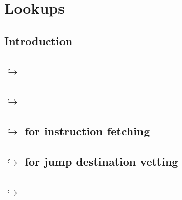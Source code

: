 

\section{Lookups } %
\subsection{Introduction                                                                                    \lispNone{} } \label{hub: lookups: intro}                                 
\subsection{\hubMod{} $\hookrightarrow$ \userTxnDataMod{}                                                    } \label{hub: lookups: into user txn data}                     %
\subsection{\hubMod{} $\hookrightarrow$ \rlpTxnMod{}                                                        \lispDone{} } \label{hub: lookups: into rlpTxn}                           
\subsection{\hubMod{} $\hookrightarrow$ \romMod{} for instruction fetching                                  \lispDone{} } \label{hub: lookups: into rom: instruction fetching}        
\subsection{\hubMod{} $\hookrightarrow$ \romMod{} for jump destination vetting                              \lispDone{} } \label{hub: lookups: into rom: jump destination vetting}    
\subsection{\hubMod{} $\hookrightarrow$ \romLexMod{}                                                         } \label{hub: lookups: into romLex}                            %
